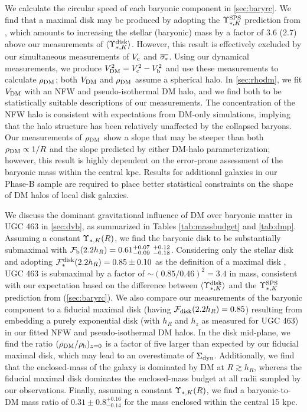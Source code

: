 \documentclass[apj,iop,numberedappendix]{emulateapj}
\begin{document}
We calculate the circular speed of each baryonic component in \sect
\ref{sec:baryrc}.  We find that a maximal disk may be produced by adopting the
$\Upsilon_{\ast,K}^{\rm SPS}$ prediction from , which amounts to
increasing the stellar (baryonic) mass by a factor of 3.6 (2.7) above our
measurements of $\langle \Upsilon_{\ast,K}^{\rm disk} \rangle$.  However, this result is effectively
excluded by our simultaneous measurements of $V_{\rm c}$ and $\overline{\sigma_{\ast}}$.  Using
our dynamical measurements, we produce $V_{\rm DM}^2 = V_{\rm c}^2 - V_{\rm b}^2$ and use these
measurements to calculate $\rho_{\rm DM}$; both $V_{\rm DM}$ and $\rho_{\rm DM}$ assume a spherical
halo.  In \sect \ref{sec:rhodm}, we fit $V_{\rm DM}$ with an NFW and pseudo-isothermal
DM halo, and we find both to be statistically suitable descriptions of our
measurements.  The concentration of the NFW halo is consistent with expectations
from DM-only simulations, implying that the halo structure has been relatively
unaffected by the collapsed baryons.  Our measurements of $\rho_{\rm DM}$ show a slope
that may be steeper than both $\rho_{\rm DM} \propto 1/R$ and the slope predicted by
either DM-halo parameterization; however, this result is highly dependent on the
error-prone assessment of the baryonic mass within the central kpc.  Results for
additional galaxies in our Phase-B sample are required to place better
statistical constraints on the shape of DM halos of local disk galaxies.

We discuss the dominant gravitational influence of DM over baryonic matter in
UGC 463 in \sect \ref{sec:dvb}, as summarized in Tables \ref{tab:massbudget} and
\ref{tab:dmp}.  Assuming a constant $\Upsilon_{\ast,K}(R)$, we find the baryonic disk to be
substantially submaximal with $\mathcal{F}_{\rm b}(2.2h_R) = 0.61^{+0.07}_{-0.09}\
^{+0.12}_{-0.18}$.  Considering only the stellar disk and adopting $\mathcal{F}_{\ast}^{\rm disk}
(2.2h_R) = 0.85\pm0.10$ as the definition of a maximal disk
\citep{1997ApJ...483..103S}, UGC 463 is submaximal by a factor of
$\sim(0.85/0.46)^2=3.4$ in mass, consistent with our expectation based on the
difference between $\langle \Upsilon_{\ast,K}^{\rm disk} \rangle$ and the $\Upsilon_{\ast,K}^{\rm SPS}$ prediction from
\citetalias{2003ApJS..149..289B} (\sect \ref{sec:baryrc}).  We also compare our
measurements of the baryonic component to a fiducial maximal disk (having $\mathcal{F}_{\rm disk}
(2.2 h_R) = 0.85$) resulting from embedding a purely exponential disk (with
$h_R$ and $h_z$ as measured for UGC 463) in our fitted NFW and pseudo-isothermal
DM halos.  In the disk mid-plane, we find the ratio $(\rho_{\rm DM}/\rho_{\rm b})_{z=0}$ is
a factor of five larger than expected by our fiducial maximal disk, which may
lead to an overestimate of $\Sigma_{\rm dyn}$.  Additionally, we find that the
enclosed-mass of the galaxy is dominated by DM at $R\gtrsim h_R$, whereas the
fiducial maximal disk dominates the enclosed-mass budget at all radii sampled by
our observations.  Finally, assuming a constant $\Upsilon_{\ast,K}(R)$, we find a
baryonic-to-DM mass ratio of $0.31\pm0.8^{+0.16}_{-0.14}$ for the mass enclosed
within the central 15 kpc.
\end{document}
